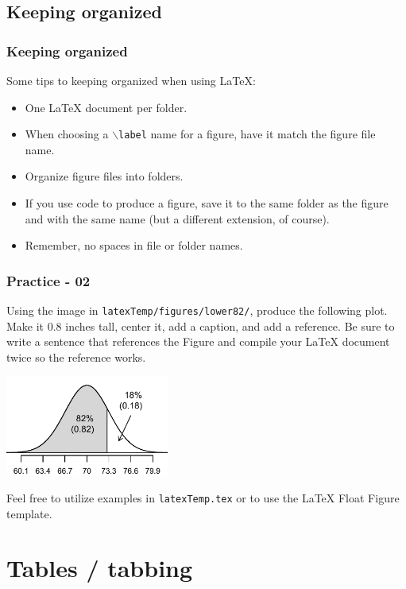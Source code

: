 \documentclass[slidestop,compress,mathserif]{beamer}
\begin{document}
\subsection[Keeping organized]{Keeping organized}
\begin{frame} \frametitle{Keeping organized}
Some tips to keeping organized when using LaTeX:
	\begin{itemize}
		\item One LaTeX document per folder.
		\item When choosing a \texttt{\color{command}$\backslash$label} name for a figure, have it match the figure file name.
		\item Organize figure files into folders.
		\item If you use code to produce a figure, save it to the same folder as the figure and with the same name (but a different extension, of course).
		\item Remember, no spaces in file or folder names.
	\end{itemize}
\end{frame}

\begin{frame}	\frametitle{Practice - 02}
	
	Using the image in \texttt{\color{highlight}latexTemp/figures/lower82/}, produce the following plot. Make it 0.8 inches tall, center it, add a caption, and add a reference. Be sure to write a sentence that references the Figure and compile your LaTeX document twice so the reference works. \\
	
		\begin{center}
			\includegraphics[height=1.3in]{documents/latexTemp/figures/lower82/lower82}
		\end{center}
		
	Feel free to utilize examples in \texttt{\color{highlight}latexTemp.tex} or to use the LaTeX Float Figure template.
		
\end{frame}


\section[Tables / tabbing]{Tables / tabbing}
\end{document}
